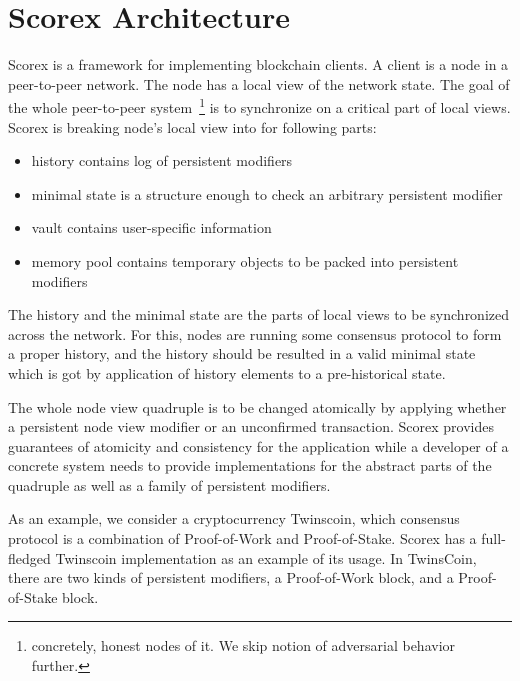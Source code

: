 
\section{Scorex Architecture}

Scorex is a framework for implementing blockchain clients. A client is a node in a peer-to-peer network. The node has a local view of the network state. The goal of the whole peer-to-peer system~\footnote{concretely, honest nodes of it. We skip notion of adversarial behavior further.} is to synchronize on a critical part of local views. Scorex is breaking node's local view into for following parts: 

\begin{itemize}
\item{history} contains log of persistent modifiers
\item{minimal state} is a structure enough to check an arbitrary persistent modifier
\item{vault} contains user-specific information
\item{memory pool} contains temporary objects to be packed into persistent modifiers 
\end{itemize}

The history and the minimal state are the parts of local views to be synchronized across the network. For this, nodes are running some consensus protocol to form a proper history, and the history should be resulted in a valid minimal state which is got by application of history elements to a pre-historical state.

The whole node view quadruple is to be changed atomically by applying whether a persistent node view modifier or an unconfirmed transaction. Scorex provides guarantees of atomicity and consistency for the application while a developer of a concrete system needs to provide implementations for the abstract parts of the quadruple as well as a family of persistent modifiers.

As an example, we consider a cryptocurrency Twinscoin, which consensus protocol is a combination of Proof-of-Work and Proof-of-Stake. Scorex has a full-fledged Twinscoin implementation as an example of its usage. In TwinsCoin, there are two kinds of persistent modifiers, a Proof-of-Work block, and a Proof-of-Stake block.  

